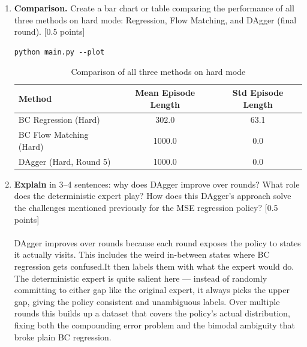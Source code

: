 \documentclass[12pt]{article}
\begin{document}
\begin{enumerate}
\item \textbf{Comparison.} Create a bar chart or table comparing the performance of all three methods on hard mode: Regression, Flow Matching, and DAgger (final round).  [0.5 points]\\

\begin{tcolorbox}[width=\linewidth, sharp corners=all, colback=white!95!black]
\begin{verbatim}
python main.py --plot
\end{verbatim}
\end{tcolorbox}

\begin{table}[h]
\centering
\begin{tabular}{lcc}
\hline
\textbf{Method} & \textbf{Mean Episode Length} & \textbf{Std Episode Length} \\
\hline
BC Regression (Hard) & 302.0 & 63.1 \\
BC Flow Matching (Hard) & 1000.0 & 0.0 \\
DAgger (Hard, Round 5) & 1000.0 & 0.0 \\
\hline
\end{tabular}
\caption{Comparison of all three methods on hard mode}
\end{table}

\item \textbf{Explain} in 3--4 sentences: why does DAgger improve over rounds? What role does the deterministic expert play? How does this DAgger's approach solve the challenges mentioned previously for the MSE regression policy? [0.5 points]\\
\\
DAgger improves over rounds because each round exposes the policy to states it actually visits. This includes the weird in-between states where BC regression gets confused.It then labels them with what the expert would do. The deterministic expert is quite salient here — instead of randomly committing to either gap like the original expert, it always picks the upper gap, giving the policy consistent and unambiguous labels. Over multiple rounds this builds up a dataset that covers the policy's actual distribution, fixing both the compounding error problem and the bimodal ambiguity that broke plain BC regression.

\end{enumerate}
\end{document}

